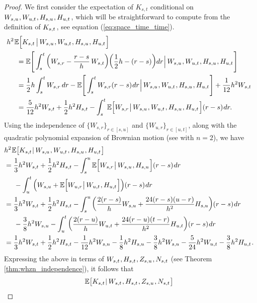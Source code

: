 \documentclass[sn-mathphys-num]{sn-jnl}%
\newcommand{\E}{\mathbb{E}}
\newcommand{\m}{\hspace{0.25mm}}
\newcommand{\mm}{\hspace{5mm}}
\begin{document}
\begin{proof} We first consider the expectation of $K_{s,t}$ conditional on $W_{s,u}\m, W_{u,t}\m, H_{s,u}\m, H_{u,t}\m$,
which will be straightforward to compute from the definition of $K_{s,t}\m$, see equation (\ref{eq:space_time_time}). 
\begin{align*}
&h^2\m\E\Big[K_{s,t}\,\big|\, W_{s,u}\m, W_{u,t}\m, H_{s,u}\m, H_{u,t}\m\Big]\\
&\mm = \E\Bigg[\int_s^t \bigg(W_{s,r} - \frac{r-s}{h}\,W_{s,t}\bigg)\bigg(\frac{1}{2}h - (r-s)\bigg) dr\m\Big|\, W_{s,u}\m, W_{u,t}\m, H_{s,u}\m, H_{u,t}\m\Bigg]\\
&\mm = \frac{1}{2}h\int_s^t W_{s,r}\, dr - \E\Bigg[\int_s^t W_{s,r}(r-s)\m dr\m\Big|\, W_{s,u}\m, W_{u,t}\m, H_{s,u}\m, H_{u,t}\m\Bigg] + \frac{1}{12}h^2 W_{s,t}\\
&\mm =\frac{5}{12}h^2 W_{s,t} + \frac{1}{2}h^2 H_{s,t} - \int_s^t \E\Big[W_{s,r}\m\big|\, W_{s,u}\m, W_{u,t}\m, H_{s,u}\m, H_{u,t}\m\Big](r-s)\m dr.
\end{align*}
Using the independence of $\{W_{s,r}\}_{r\in[s,u]}$ and $\{W_{u,r}\}_{r\in[u,t]}$, along with the quadratic polynomial expansion of Brownian motion (see \cite[Theorem 2.4]{foster2020poly} with $n=2$), we have
\begin{align*}
&h^2\m\E\big[K_{s,t}\m|\, W_{s,u}\m, W_{u,t}\m, H_{s,u}\m, H_{u,t}\m\big]\\
& =\frac{1}{3}h^2 W_{s,t} + \frac{1}{2}h^2 H_{s,t} - \int_s^u \E\Big[W_{s,r}\m\big|\, W_{s,u}\m, H_{s,u}\m\Big](r-s)\m dr\\
&\mm - \int_u^t \Big(W_{s,u} + \E\Big[W_{u,r}\m\big|\, W_{u,t}\m, H_{u,t}\m\Big]\Big)(r-s)\m dr\\
&= \frac{1}{3}h^2 W_{s,t}+ \frac{1}{2}h^2 H_{s,t} - \int_s^u \bigg(\frac{2(r-s)}{h}W_{s,u} + \frac{24(r-s)(u-r)}{h^2}H_{s,u}\bigg)(r-s)\m dr\\
&\mm - \frac{3}{8}h^2 W_{s,u} - \int_u^t \bigg(\frac{2(r-u)}{h}W_{u,t} + \frac{24(r-u)(t-r)}{h^2}H_{u,t}\bigg)(r-s)\m dr\\
& = \frac{1}{3}h^2 W_{s,t}+ \frac{1}{2}h^2 H_{s,t} - \frac{1}{12}h^2 W_{s,u} - \frac{1}{8}h^2 H_{s,u} - \frac{3}{8}h^2 W_{s,u} - \frac{5}{24}h^2 W_{u,t} - \frac{3}{8}h^2  H_{u,t}\m.
\end{align*}
Expressing the above in terms of $W_{s,t}\m, H_{s,t}\m, Z_{s,u}\m, N_{s,t}$ (see Theorem \ref{thm:whzn_independence}), it follows that
\begin{align*}
&\E\big[K_{s,t}\m|\, W_{s,t}\m, H_{s,t}\m, Z_{s,u}\m, N_{s,t}\m\big]\\

\end{align*}
\end{proof}
\end{document}
